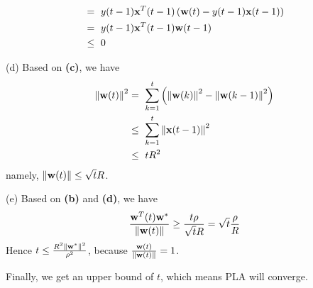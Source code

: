 \documentclass{article}
\begin{document}
\begin{tlist}{4}
\begin{align*}
		 & =\ y(t-1)\vx^T(t-1)\left(\vw(t) -  y(t-1)\vx(t-1)\right)                       \\
		 & =\ y(t-1)\vx^T(t-1)\vw(t-1)                                                    \\
		 & \leq\ 0
	\end{align*}
	\item[(d)]
	Based on \textbf{(c)}, we have
	\begin{align*}
		\left\|{\mathbf w}(t)\right\|^2
		 & =\ \sum_{k = 1}^{t}\left(\left\|{\mathbf w}(k)\right\|^2 - \left\|{\mathbf w}(k-1)\right\|^2\right) \\
		 & \leq\ \sum_{k = 1}^{t}\left\|{\mathbf x}(t-1)\right\|^2                            \\
		 & \leq\ tR^2
	\end{align*}
	namely, $\left\|{\mathbf w}(t)\right\| \leq \sqrt{t}R$.
	\item[(e)]
	Based on \textbf{(b)} and \textbf{(d)}, we have
	$$\frac{{\mathbf w}^T(t){\mathbf w}^*}{\left\|{\mathbf w}(t)\right\|} \geq \frac{t\rho}{\sqrt{t}R} = \sqrt{t}\frac{\rho}{R}$$
	Hence $t\leq\frac{R^2\left\|{\mathbf w}^*\right\|^2}{\rho^2}$, because $\frac{{\mathbf w}(t)}{\left\|{\mathbf w}(t)\right\|}=1$.
\end{tlist}
Finally, we get an upper bound of $t$, which means PLA will converge.
\end{document}
